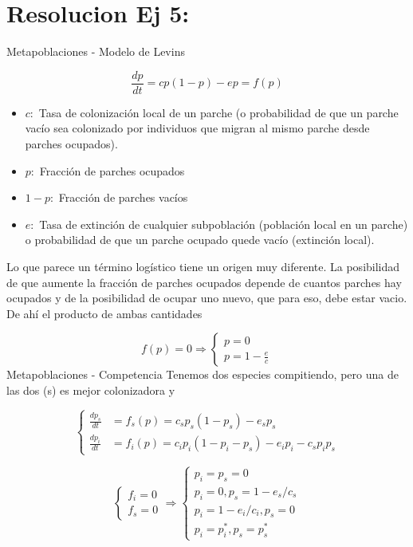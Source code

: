 \documentclass[twocolumn,aps,prl]{revtex4-1}
\begin{document}
\section{Resolucion Ej 5:}

Metapoblaciones - Modelo de Levins


$$\frac{d p}{d t}=c p(1-p)-e p = f(p)$$

\begin{itemize}
    \item $c:$ Tasa de colonización local de un parche (o probabilidad de que un parche vacío sea colonizado por individuos que migran al mismo parche desde parches ocupados). 
    \item $p:$ Fracción de parches ocupados
    \item $1-p:$ Fracción de parches vacíos
    \item $e:$ Tasa de extinción de cualquier subpoblación (población local en un parche) o probabilidad de que un parche ocupado quede vacío (extinción local).
\end{itemize}

Lo que parece un término logístico tiene un origen muy diferente. La posibilidad de que aumente la fracción de parches ocupados depende de cuantos parches hay ocupados y de la posibilidad de ocupar uno nuevo, que para eso, debe estar vacio. De ahí el producto de ambas cantidades

$$
f(p) = 0 \Rightarrow\left\{
\begin{array}{l}
    p=0 \\ 
    p=1-\frac{e}{c}
\end{array}
\right.
$$
Metapoblaciones - Competencia
Tenemos dos especies compitiendo, pero una de las dos (s) es mejor colonizadora y

$$
\left\{
\begin{aligned}
    \frac{d p_{s}}{d t} &=f_{s}(p)=c_{s} p_{s}\left(1-p_{s}\right)-e_{s} p_{s} \\ 
    \frac{d p_{i}}{d t} &=f_{i}(p)=c_{i} p_{i}\left(1-p_{i}-p_{s}\right)-e_{i} p_{i}-c_{s} p_{i} p_{s}
\end{aligned} 
\right.
$$

$$
\left\{
\begin{array} { l } 
    { f _ { i } = 0 } \\
    { f _ { s } = 0 }
\end{array} 
\right. 
\Rightarrow 
\left\{
\begin{array}{l}
    p_{i}=p_{s}=0 \\
    p_{i}=0, p_{s}=1-e_{s} / c_{s} \\
    p_{i}=1-e_{i} / c_{i}, p_{s}=0 \\
    p_{i}=p_{i}^{*}, p_{s}=p_{s}^{*}
\end{array}
\right.
$$
\end{document}
